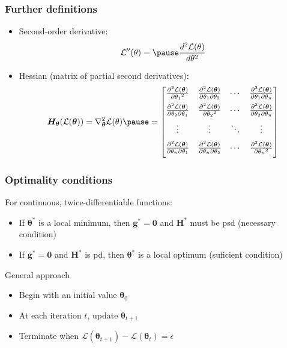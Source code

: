\documentclass[smaller]{beamer}
\newcommand{\?}{\stackrel{?}{=}}
\newcommand{\fr}{\frac}
\newcommand{\pdd}[2]{\frac{\partial^2{#1}}{\partial{#2}^2}}
\newcommand{\pde}[3]{\frac{\partial^2{#1}}{\partial{#2}\partial{#3}}}
\renewcommand{\th}{\theta}
\newcommand{\mc}{\mathcal}
\newcommand{\pe}{\pause}
\begin{document}
\begin{frame}
  \frametitle{Further definitions}
  \pause
  \begin{itemize}
  \item Second-order derivative: \pause
    \begin{equation}
      \mc{L}''(\th) = \pause \fr{d^{2}\mc{L}(\th)}{d\th^{2}}
    \end{equation}
    
    \bigskip\pause
  \item Hessian (matrix of partial second derivatives):\pause
    \begin{equation}
      \bm H_{\bm\th}(\mc{L}(\bm\th)) = \nabla^{2}_{\bm\th}\mc{L}(\th) \pause =
      \begin{bmatrix}
        \pdd{\mc{L}(\bm \th)}{\th_{1}} & \pde{\mc{L}(\bm \th)}{\th_{1}}{\th_{2}} & \cdots & \pde{\mc{L}(\bm \th)}{\th_{1}}{\th_{n}} \\[2mm]
        \pde{\mc{L}(\bm \th)}{\th_{2}}{\th_{1}} & \pdd{\mc{L}(\bm \th)}{\th_{2}} &  \cdots & \pde{\mc{L}(\bm \th)}{\th_{2}}{\th_{n}} \\[2mm]
        \vdots & \vdots & \ddots & \vdots \\[2mm]
        \pde{\mc{L}(\bm \th)}{\th_{n}}{\th_{1}} & \pde{\mc{L}(\bm \th)}{\th_{n}}{\th_{2}}&  \cdots & \pdd{\mc{L}(\bm \th)}{\th_{n}} \\[2mm]
      \end{bmatrix}      
    \end{equation}

    \pause


  \end{itemize}
 
\end{frame}

\begin{frame}
  \frametitle{Optimality conditions}
  \pe
  For continuous, twice-differentiable functions:\pe
  \begin{itemize}
  \item If $\bm\th^*$ is a local minimum, then $\bm g^* = \bm 0$ and $\bm H^*$ must be psd (necessary condition) \pe

    \item If $\bm g^* = \bm 0$ and $\bm H^*$ is pd, then $\bm\th^*$ is a local optimum (suficient condition)
    \end{itemize}

    \pe
    \begin{block}{General approach}
      \pe
      \begin{itemize}
      \item Begin with an initial value $\bm\th_{0}$\pe
      \item At each iteration $t$, update $\bm\th_{t+1}$
      \item Terminate when $\mc{L}(\bm\th_{t+1})- \mc{L}(\bm\th_{t}) = \epsilon$
      \end{itemize}
    \end{block}
\end{frame}
\end{document}
